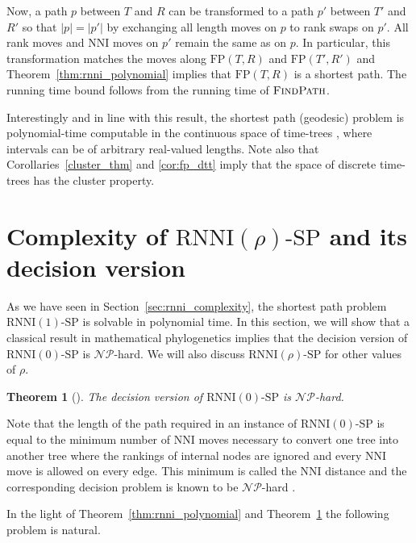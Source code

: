 \documentclass[11pt]{amsart}
\newtheorem{theorem}{Theorem}
\newcommand{\rnni}{\mathrm{RNNI}}
\newcommand{\findpath}{\textsc{FindPath}}
\newcommand{\nni}{\mathrm{NNI}}
\newcommand{\fp}{\mathrm{FP}}
\newcommand{\np}{\mathcal{NP}}
\newcommand{\p}{\mathcal{P}}
\newcommand{\decprob}[1]{\rnni(#1)\text{-}\mathrm{SP}}
\newcommand{\summary}[1]{} %
\begin{document}
Now, a path $p$ between $T$ and $R$ can be transformed to a path $p'$ between $T'$ and $R'$ so that $|p| = |p'|$ by exchanging all length moves on $p$ to rank swaps on $p'$.
All rank moves and $\nni$ moves on $p'$ remain the same as on $p$.
In particular, this transformation matches the moves along $\fp(T,R)$ and $\fp(T',R')$ and Theorem~\ref{thm:rnni_polynomial} implies that $\fp(T, R)$ is a shortest path.
The running time bound follows from the running time of $\findpath$.
\endproof

Interestingly and in line with this result, the shortest path (geodesic) problem is polynomial-time computable in the continuous space of time-trees \autocite{Gavryushkin2016-uu}, where intervals can be of arbitrary real-valued lengths.
Note also that Corollaries~\ref{cluster_thm} and \ref{cor:fp_dtt} imply that the space of discrete time-trees has the cluster property.


\section{Complexity of $\decprob{\rho}$ and its decision version}

\summary{Summarising results on complexity of $\decprob{\rho}$ -- $\decprob{1} \in \p$ and $\decprob{0} \in \np$}
As we have seen in Section~\ref{sec:rnni_complexity}, the shortest path problem $\decprob{1}$ is solvable in polynomial time.
In this section, we will show that a classical result in mathematical phylogenetics implies that the decision version of $\decprob{0}$ is $\np$-hard.
We will also discuss $\decprob{\rho}$ for other values of $\rho$.

\begin{theorem}[\textcite{Dasgupta2000-xa}]
The decision version of $\decprob{0}$ is $\np$-hard.
\label{thm:nni_hard}
\end{theorem}

\proof
Note that the length of the path required in an instance of $\decprob{0}$ is equal to the minimum number of $\nni$ moves necessary to convert one tree into another tree where the rankings of internal nodes are ignored and every $\nni$ move is allowed on every edge.
This minimum is called the $\nni$ distance and the corresponding decision problem is known to be $\np$-hard \autocite{Dasgupta2000-xa}.
\endproof

\summary{Complexity of $\decprob{\rho}$ changes somewhere between zero and one -- where remains an open question}
In the light of Theorem~\ref{thm:rnni_polynomial} and Theorem~\ref{thm:nni_hard} the following problem is natural.
\end{document}
